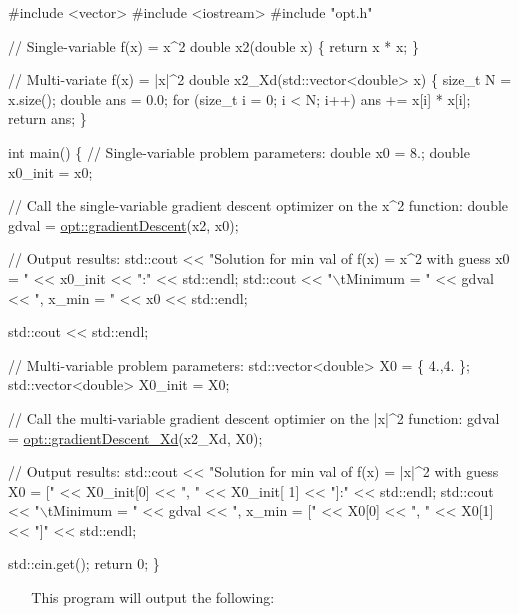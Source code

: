 \begin{DoxyCodeInclude}
\textcolor{preprocessor}{#include <vector>}
\textcolor{preprocessor}{#include <iostream>}
\textcolor{preprocessor}{#include "opt.h"}

\textcolor{comment}{// Single-variable f(x) = x^2}
\textcolor{keywordtype}{double} x2(\textcolor{keywordtype}{double} x)
\{
    \textcolor{keywordflow}{return} x * x;
\}

\textcolor{comment}{// Multi-variate f(x) = |x|^2}
\textcolor{keywordtype}{double} x2\_Xd(std::vector<double> x)
\{
    \textcolor{keywordtype}{size\_t} N = x.size();
    \textcolor{keywordtype}{double} ans = 0.0;
    \textcolor{keywordflow}{for} (\textcolor{keywordtype}{size\_t} i = 0; i < N; i++)
        ans += x[i] * x[i];
    \textcolor{keywordflow}{return} ans;
\}

\textcolor{keywordtype}{int} main()
\{
    \textcolor{comment}{// Single-variable problem parameters:}
    \textcolor{keywordtype}{double} x0 = 8.;
    \textcolor{keywordtype}{double} x0\_init = x0;

    \textcolor{comment}{// Call the single-variable gradient descent optimizer on the x^2 function:}
    \textcolor{keywordtype}{double} gdval = \mbox{\hyperlink{namespaceopt_af1ef2e32062af31429ae74fc07c57fb0}{opt::gradientDescent}}(x2, x0);

    \textcolor{comment}{// Output results:}
    std::cout << \textcolor{stringliteral}{"Solution for min val of f(x) = x^2 with guess x0 = "} << x0\_init << \textcolor{stringliteral}{":"} << std::endl;
    std::cout <<  \textcolor{stringliteral}{"\(\backslash\)tMinimum = "} << gdval << \textcolor{stringliteral}{", x\_min = "} << x0 << std::endl;

    std::cout << std::endl;

    \textcolor{comment}{// Multi-variable problem parameters:}
    std::vector<double> X0 = \{ 4.,4. \};
    std::vector<double> X0\_init = X0;

    \textcolor{comment}{// Call the multi-variable gradient descent optimier on the |x|^2 function:}
    gdval = \mbox{\hyperlink{namespaceopt_a7db27c86e1c5a503b7f8373ba067d97b}{opt::gradientDescent\_Xd}}(x2\_Xd, X0);

    \textcolor{comment}{// Output results:}
    std::cout << \textcolor{stringliteral}{"Solution for min val of f(x) = |x|^2 with guess X0 = ["} << X0\_init[0] << \textcolor{stringliteral}{", "} << X0\_init[
      1] << \textcolor{stringliteral}{"]:"} << std::endl;
    std::cout << \textcolor{stringliteral}{"\(\backslash\)tMinimum = "} << gdval << \textcolor{stringliteral}{", x\_min = ["} << X0[0] << \textcolor{stringliteral}{", "} << X0[1] << \textcolor{stringliteral}{"]"} << std::endl;

    std::cin.get();
    \textcolor{keywordflow}{return} 0;
\}
\end{DoxyCodeInclude}
 ~\newline
~\newline
 This program will output the following\+: ~\newline
 

